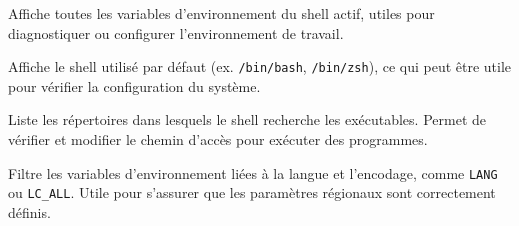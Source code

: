 \documentclass[a4paper]{report}
\begin{document}
    \begin{Concept}
        \noindent{}  
        Affiche toutes les variables d'environnement du shell actif, utiles pour 
        diagnostiquer ou configurer l'environnement de travail. 
        \\\vspace{0.75em}

        \noindent{}  
        Affiche le shell utilisé par défaut (ex. \texttt{/bin/bash}, \texttt{/bin/zsh}), 
        ce qui peut être utile pour vérifier la configuration du système. 
        \\\vspace{0.75em}

        \noindent{}  
        Liste les répertoires dans lesquels le shell recherche les exécutables. 
        Permet de vérifier et modifier le chemin d'accès pour exécuter des programmes. 
        \\\vspace{0.75em}

        \noindent{}  
        Filtre les variables d'environnement liées à la langue et l'encodage, comme 
        \texttt{LANG} ou \texttt{LC\_ALL}. Utile pour s'assurer que les paramètres 
        régionaux sont correctement définis.
    \end{Concept}











        
\end{document}
